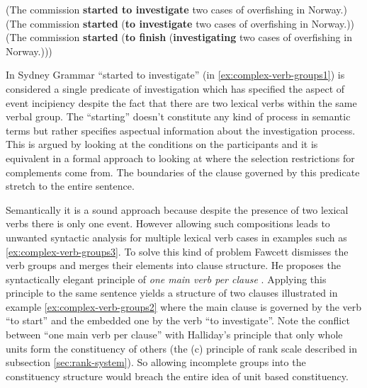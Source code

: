 \begin{exe}
	\ex\label{ex:complex-verb-groups1}
	(The commission \textbf{started to investigate} two cases of overfishing in Norway.)  
	\ex\label{ex:complex-verb-groups2}
	(The commission \textbf{started} (\textbf{to investigate} two cases of overfishing in Norway.))
	\ex\label{ex:complex-verb-groups3}
	(The commission \textbf{started} (\textbf{to finish} (\textbf{investigating} two cases of overfishing in Norway.)))
\end{exe}

In Sydney Grammar ``started to investigate'' (in \ref{ex:complex-verb-groups1}) is considered a single predicate of investigation which has specified the aspect of event incipiency despite the fact that there are two lexical verbs within the same verbal group. The ``starting'' doesn't constitute any kind of process in semantic terms but rather specifies aspectual information about the investigation process. 
This is argued by looking at the conditions on the participants and it is equivalent in a formal approach to looking at where the selection restrictions for complements come from.
The boundaries of the clause governed by this predicate stretch to the entire sentence.

Semantically it is a sound approach because despite the presence of two lexical verbs there is only one event. However allowing such compositions leads to unwanted syntactic analysis for multiple lexical verb cases in examples such as \ref{ex:complex-verb-groups3}. To solve this kind of problem Fawcett dismisses the verb groups and merges their elements into clause structure. He proposes the syntactically elegant principle of \textit{one main verb per clause} \citep{Fawcett2008}. Applying this principle to the same sentence yields a structure of two clauses illustrated in example \ref{ex:complex-verb-groups2} where the main clause is governed by the verb ``to start'' and the embedded one by the verb ``to investigate''. Note the conflict between ``one main verb per clause'' with Halliday's principle that only whole units form the constituency of others (the (c) principle of rank scale described in subsection \ref{sec:rank-system}). So allowing incomplete groups into the constituency structure would breach the entire idea of unit based constituency. 

